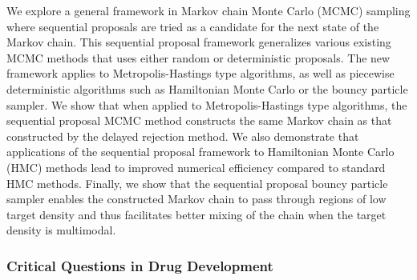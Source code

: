 \begin{itemize}
We explore a general framework in Markov chain Monte Carlo (MCMC) sampling where sequential proposals are tried as a candidate for the next state of the Markov chain. This sequential proposal framework generalizes various existing MCMC methods that uses either random or deterministic proposals. The new framework applies to Metropolis-Hastings type algorithms, as well as piecewise deterministic algorithms such as Hamiltonian Monte Carlo or the bouncy particle sampler. We show that when applied to Metropolis-Hastings type algorithms, the sequential proposal MCMC method constructs the same Markov chain as that constructed by the delayed rejection method. We also demonstrate that applications of the sequential proposal framework to Hamiltonian Monte Carlo (HMC) methods lead to improved numerical efficiency compared to standard HMC methods. Finally, we show that the sequential proposal bouncy particle sampler enables the constructed Markov chain to pass through regions of low target density and thus facilitates better mixing of the chain when the target density is multimodal.

\end{itemize}

\subsubsection*{Critical Questions in Drug Development}

